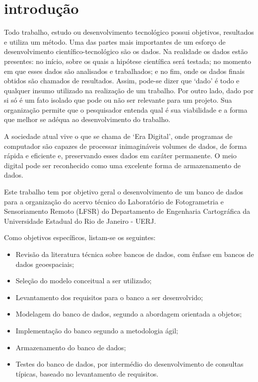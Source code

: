 \chapter*{introdução}


Todo trabalho, estudo ou desenvolvimento tecnológico possui objetivos, resultados e utiliza um método. Uma das partes mais importantes de um esforço de desenvolvimento científico-tecnológico são os dados. Na realidade os dados estão presentes: no início, sobre os quais a hipótese científica será testada; no momento em que esses dados são analisados e trabalhados; e no fim, onde os dados finais obtidos são chamados de resultados. Assim, pode-se dizer que `dado' é todo e qualquer insumo utilizado na realização de um trabalho. 
Por outro lado, dado por si só é um fato isolado que pode ou não ser relevante para um projeto. Sua organização permite que o pesquisador entenda qual é sua viabilidade e a forma que melhor se adéqua ao desenvolvimento do trabalho. 

A sociedade atual vive o que se chama de `Era Digital', onde programas de computador são capazes de processar inimagináveis volumes de dados, de forma rápida e eficiente e, preservando esses dados em caráter permanente. O meio digital pode ser reconhecido como uma excelente forma de armazenamento de dados.

Este trabalho tem por objetivo geral o desenvolvimento de um banco de dados para a organização do acervo técnico do Laboratório de Fotogrametria e Sensoriamento Remoto (LFSR) do Departamento de Engenharia Cartográfica da Universidade Estadual do Rio de Janeiro - UERJ. 

Como objetivos específicos, listam-se os seguintes:
\begin{itemize}
\item Revisão da literatura técnica sobre bancos de dados, com ênfase em bancos de dados geoespaciais;
\item Seleção do modelo conceitual a ser utilizado;
\item Levantamento dos requisitos para o banco a ser desenvolvido;
\item Modelagem do banco de dados, segundo a abordagem orientada a objetos;
\item Implementação do banco segundo a metodologia ágil;
\item Armazenamento do banco de dados;
\item Testes do banco de dados, por intermédio do desenvolvimento de consultas típicas, baseado no levantamento de requisitos.
\end{itemize}

